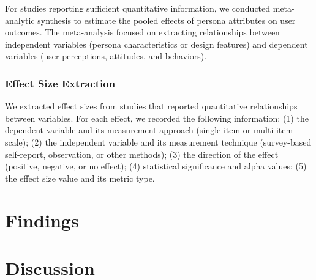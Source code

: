 \documentclass{article}
\begin{document}
For studies reporting sufficient quantitative information, we conducted meta-analytic synthesis to estimate the pooled effects of persona attributes on user outcomes. The meta-analysis focused on extracting relationships between independent variables (persona characteristics or design features) and dependent variables (user perceptions, attitudes, and behaviors).

\subsubsection{Effect Size Extraction}

We extracted effect sizes from studies that reported quantitative relationships between variables. For each effect, we recorded the following information: (1) the dependent variable and its measurement approach (single-item or multi-item scale); (2) the independent variable and its measurement technique (survey-based self-report, observation, or other methods); (3) the direction of the effect (positive, negative, or no effect); (4) statistical significance and alpha values; (5) the effect size value and its metric type. 

% 

\section{Findings}

\section{Discussion}

\section{}



\printbibliography
\end{document}
